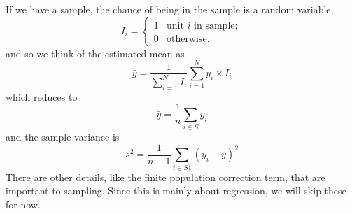 If we have a sample, the chance of being in the sample is a random variable,
\begin{equation}
I_{i} = \left\{ \begin{array}{ll}
     1 & \mbox{unit } i \mbox{ in sample};\\
     0 & \mbox{otherwise}.\end{array} \right.
\end{equation}
and so we think of the estimated mean as
\begin{equation}
\bar{y} = \frac{1}{\sum_{i=1}^NI_i}\sum_{i=1}^Ny_i\times I_i
\end{equation}
which reduces to
\begin{equation}
\bar{y} = \frac{1}{n}\sum_{i\in S}y_i
\end{equation}
and the sample variance is
\begin{equation}
s^2 = \frac{1}{n-1}\sum_{i \in S1}\left(y_i-\bar{y}\right)^2
\end{equation}
There are other details, like the finite population correction term, that are important to sampling. Since this is mainly about regression, we will skip these for now.
